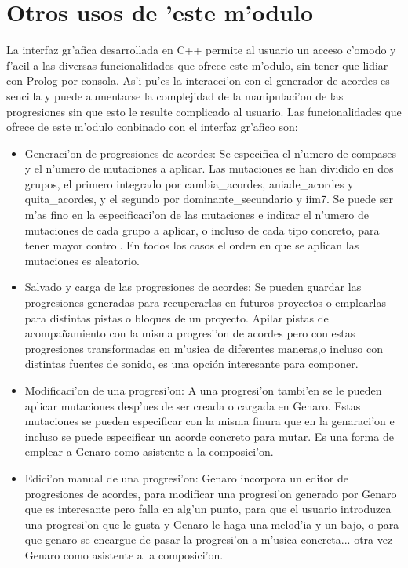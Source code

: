\section {Otros usos de 'este m'odulo}
La interfaz gr'afica desarrollada en C++ permite al usuario un acceso c'omodo y f'acil a las diversas funcionalidades que ofrece este m'odulo, sin tener que lidiar con Prolog por consola. As'i pu'es la interacci'on con el generador de acordes es sencilla y puede aumentarse la complejidad de la manipulaci'on de las progresiones sin que esto le resulte complicado al usuario. Las funcionalidades que ofrece de este m'odulo conbinado con el interfaz gr'afico son:
\begin{itemize}
\item Generaci'on de progresiones de acordes: Se especifica el n'umero de compases y el n'umero de mutaciones a aplicar.  Las mutaciones se han dividido en dos grupos, el primero integrado por cambia\_acordes, aniade\_acordes y quita\_acordes, y el segundo por dominante\_secundario y iim7. Se puede ser m'as fino en la especificaci'on de las mutaciones e indicar el n'umero de mutaciones de cada grupo a aplicar, o incluso de cada tipo concreto, para tener mayor control. En todos los casos el orden en que se aplican las mutaciones es aleatorio.
\item Salvado y carga de las progresiones de acordes: Se pueden guardar las progresiones generadas para recuperarlas en futuros proyectos o emplearlas para distintas pistas o bloques de un proyecto. Apilar pistas de acompañamiento con la misma progresi'on de acordes pero con estas progresiones transformadas en m'usica de diferentes maneras,o incluso con distintas fuentes de sonido, es una opción interesante para componer.
\item Modificaci'on de una progresi'on: A una progresi'on tambi'en se le pueden aplicar mutaciones desp'ues de ser creada o cargada en Genaro. Estas mutaciones se pueden especificar con la misma finura que en la genaraci'on e incluso se puede especificar un acorde concreto para mutar. Es una forma de emplear a Genaro como asistente a la composici'on.
\item Edici'on manual de una progresi'on: Genaro incorpora un editor de progresiones de acordes, para modificar una progresi'on generado por Genaro que es interesante pero falla en alg'un punto, para que el usuario introduzca una progresi'on que le gusta y Genaro le haga una melod'ia y un bajo, o para que genaro se encargue de pasar la progresi'on a m'usica concreta... otra vez Genaro como asistente a la composici'on.
\end{itemize}

